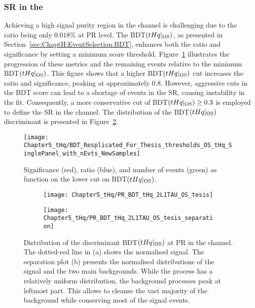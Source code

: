 \subsubsection{SR in the \dilepOStau}
\label{sec:ChaptH:EventSelection:SR:OS}
Achieving a high signal purity region in the \dilepOStau channel is challenging due to 
the \StoB ratio being only $0.018\%$ at PR level. The BDT$(tHq|_{\text{OS}})$, as presented in 
Section~\ref{sec:ChaptH:EventSelection:BDT}, enhances both the \StoB ratio and significance 
by setting a minimum score threshold. Figure~\ref{fig:ChaptH:EventSelection:SR_OS:Significance} 
illustrates the progression of these metrics and the remaining \tHq events relative to the minimum 
BDT$(tHq|_{\text{OS}})$. This figure shows that a higher BDT$(tHq|_{\text{OS}})$ cut increases 
the \StoB ratio and significance, peaking at approximately 0.8. However, aggressive cuts in the BDT 
score can lead to a shortage of events in the SR, causing instability in the fit. Consequently, a more 
conservative cut of  BDT$(tHq|_{\text{OS}})\geq 0.3$ is employed to define the SR in the \dilepOStau 
channel.
The distribution of the BDT$(tHq|_{\text{OS}})$ discriminant is presented in
Figure~\ref{fig:ChaptH:EventSelection:SR:OS:BDT_score_distribution}.

\begin{figure}[h]
\centering
  \texttt{[image: Chapter5\_tHq/BDT\_Resplicated\_For\_Thesis\_thresholds\_OS\_tHq\_SinglePanel\_with\_nEvts\_NewSamples]}
\caption{Significance (red), \StoB ratio (blue), and number of \tHq events (green) as function on the lower cut on BDT$(tHq|_{\text{OS}})$.}
\label{fig:ChaptH:EventSelection:SR_OS:Significance}
\end{figure}

\begin{figure}[h]
\centering
\begin{subfigure}{.45\textwidth}
  \centering
  \texttt{[image: Chapter5\_tHq/PR\_BDT\_tHq\_2L1TAU\_OS\_tesis]}
  \caption{}
\end{subfigure}%
\begin{subfigure}{.5 \textwidth}
  \centering
  \texttt{[image: Chapter5\_tHq/PR\_BDT\_tHq\_2L1TAU\_OS\_tesis\_separation]}
  \caption{}
\end{subfigure}
\caption{Distribution of the discriminant BDT$(tHq|_{\text{OS}})$ at PR in the \dilepOStau channel.
The dotted-red line in (a) shows the normalised \tHq signal.
The separation plot (b) presents the normalised distributions of the \tHq signal and the two main backgrounds.
While the \tHq process has a relatively uniform distribution, the background processes peak at leftmost
part. This allows to cleanse the vast majority of the background while conserving most of the signal events.}
\label{fig:ChaptH:EventSelection:SR:OS:BDT_score_distribution}
\end{figure}



